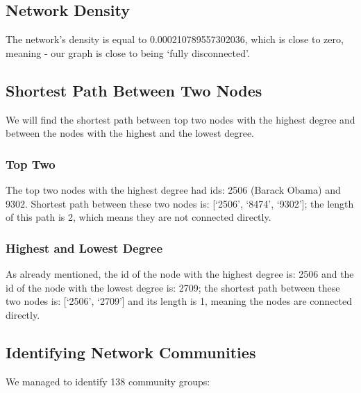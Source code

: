 \documentclass[
]{article}
\begin{document}
\hypertarget{network-density}{%
\subsection{Network Density}\label{network-density}}

The network's density is equal to 0.000210789557302036, which is close
to zero, meaning - our graph is close to being `fully disconnected'.

\hypertarget{shortest-path-between-two-nodes}{%
\subsection{Shortest Path Between Two
Nodes}\label{shortest-path-between-two-nodes}}

We will find the shortest path between top two nodes with the highest
degree and between the nodes with the highest and the lowest degree.

\hypertarget{top-two}{%
\subsubsection{Top Two}\label{top-two}}

The top two nodes with the highest degree had ids: 2506 (Barack Obama)
and 9302. Shortest path between these two nodes is: {[}`2506', `8474',
`9302'{]}; the length of this path is 2, which means they are not
connected directly.

\hypertarget{highest-and-lowest-degree}{%
\subsubsection{Highest and Lowest
Degree}\label{highest-and-lowest-degree}}

As already mentioned, the id of the node with the highest degree is:
2506 and the id of the node with the lowest degree is: 2709; the
shortest path between these two nodes is: {[}`2506', `2709'{]} and its
length is 1, meaning the nodes are connected directly.

\hypertarget{identifying-network-communities}{%
\subsection{Identifying Network
Communities}\label{identifying-network-communities}}

We managed to identify 138 community groups:
\end{document}
